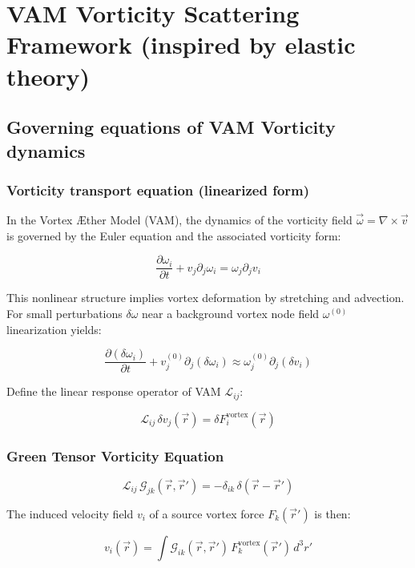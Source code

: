 \section{VAM Vorticity Scattering Framework (inspired by elastic theory)}

\subsection{Governing equations of VAM Vorticity dynamics}

\subsubsection*{Vorticity transport equation (linearized form)}

In the Vortex Æther Model (VAM), the dynamics of the vorticity field \(\vec{\omega} = \nabla \times \vec{v}\) is governed by the Euler equation and the associated vorticity form:

\[
    \frac{\partial \omega_i}{\partial t} + v_j \partial_j \omega_i = \omega_j \partial_j v_i
\]

This nonlinear structure implies vortex deformation by stretching and advection. For small perturbations \(\delta\omega\) near a background vortex node field \(\omega^{(0)}\) linearization yields:

\[
    \frac{\partial (\delta \omega_i)}{\partial t} + v_j^{(0)} \partial_j (\delta \omega_i) \approx \omega_j^{(0)} \partial_j (\delta v_i)
\]

Define the linear response operator of VAM \(\mathcal{L}_{ij}\):

\[
    \mathcal{L}_{ij} \, \delta v_j(\vec{r}) = \delta F_i^\text{vortex}(\vec{r})
\]

\subsubsection*{Green Tensor Vorticity Equation}

\[
    \mathcal{L}_{ij} \, \mathcal{G}_{jk}(\vec{r}, \vec{r}') = -\delta_{ik} \, \delta(\vec{r} - \vec{r}')
\]

The induced velocity field \(v_i\) of a source vortex force \(F_k(\vec{r}')\) is then:

\[
    v_i(\vec{r}) = \int \mathcal{G}_{ik}(\vec{r}, \vec{r}') \, F_k^\text{vortex}(\vec{r}') \, d^3 r'
\]

